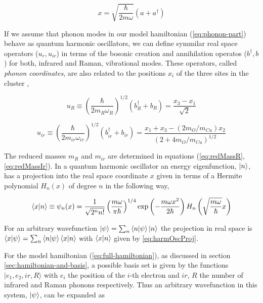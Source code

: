 \begin{equation}
  \label{eq:harmOscRel}
  x=\sqrt{\frac{\hbar}{2m\omega}}\left(a+a^\dagger\right)
\end{equation}

If we assume that phonon modes in our model hamiltonian (\ref{eq:phonon-part}) behave as quantum harmonic oscillators, we can define symmilar real space operators ($u_r,u_{ir}$) in terms of the bosonic creation and annihilation operatos ($b^\dagger,b$) for both, infrared and Raman, vibrational modes. 
These operators, called \textit{phonon coordinates}, are also related to the positions $x_i$ of the three sites in the cluster \cite{MustredeLeon1992},

\begin{equation}
  \label{eq:uR}
  u_R \equiv \left(\frac{\hbar}{2 m_R \omega_R}\right)^{1/2}(b_R^\dagger + b_R) = \frac{x_3 - x_1}{\sqrt{2}}
\end{equation}

\begin{equation}
  \label{eq:uir}
  u_{ir} \equiv \left(\frac{\hbar}{2 m_{ir} \omega_{ir}}\right)^{1/2}(b^\dagger_{ir}+b_{ir}) = \frac{ x_1 + x_3 - ( 2 m_O/m_{Cu})x_2}{(2 + 4 m_O/m_{Cu})^{1/2}}
\end{equation}

The reduced masses $m_R$ and $m_{ir}$ are determined in equations (\ref{eq:redMassR}, \ref{eq:redMassIr}).
In a quantum harmonic oscillator an energy eigenfunction, $\left | n \right\rangle$, has a projection into the real space coordinate $x$ given in terms of a Hermite polynomial $H_n(x)$ of degree $n$ in the following way,

\begin{equation}
  \label{eq:harmOscProj}
  \left\langle x|n\right\rangle 
  \equiv \psi_n(x) 
  = \frac{1}{\sqrt{2^n n!}} \left(\frac{m \omega}{\pi \hbar}\right)^{1/4}
  \exp\left(-\frac{m \omega x^2}{2 \hbar}\right) H_n\left( \sqrt{\frac{m \omega}{\hbar}} x \right) 
\end{equation}


For an arbitrary wavefunction $\left | \psi \right\rangle = \sum_n \left\langle n|\psi\right\rangle \left | n \right\rangle$ the projection in real space is $\left\langle x|\psi\right\rangle = \sum_n \left\langle n|\psi\right\rangle \left\langle x|n\right\rangle$ with $\left\langle x|n\right\rangle$ given by \ref{eq:harmOscProj}.

For the model hamiltonian (\ref{eq:full-hamiltonian}), as discussed in section \ref{sec:hamiltonian-and-basis}, a possible basis set is given by the functions ${| e_1, e_2, ir, R \rangle}$ with $e_i$ the position of the $i$-th electron and $ir$, $R$ the number of infrared and Raman phonons respectively. 
Thus an arbitrary wavefunction in this system, $\left | \psi \right\rangle$, can be expanded as

